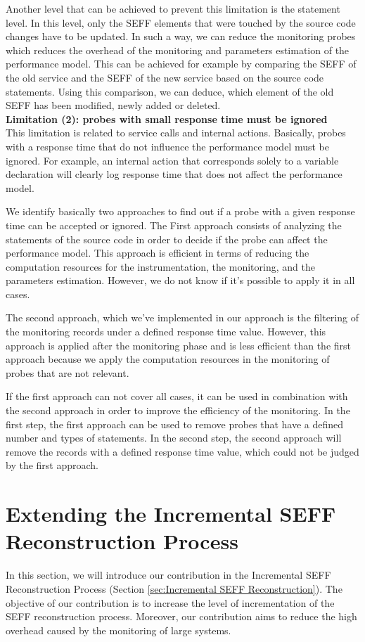 Another level that can be achieved to prevent this limitation is the statement level. In this level, only the SEFF elements that were touched by the source code changes have to be updated. In such a way, we can reduce the monitoring probes which reduces the overhead of the monitoring and parameters estimation of the performance model. This can be achieved for example by comparing the SEFF of the old service and the SEFF of the new service based on the source code statements. Using this comparison, we can deduce, which element of the old SEFF has been modified, newly added or deleted.  \\

\textbf{Limitation (2): probes with small response time must be ignored}\\
This limitation is related to service calls and internal actions. Basically, probes with a response time that do not influence the performance model must be ignored. For example, an internal action that corresponds solely to a variable declaration will clearly log response time that does not affect the performance model.
 
We identify basically two approaches to find out if a probe with a given response time can be accepted or ignored. The First approach consists of analyzing the statements of the source code in order to decide if the probe can affect the performance model. This approach is efficient in terms of reducing the computation resources for the instrumentation, the monitoring, and the parameters estimation.  However, we do not know if it's possible to apply it in all cases.

The second approach, which we've implemented in our approach is the filtering of the monitoring records under a defined response time value. However, this approach is applied after the monitoring phase and is less efficient than the first approach because we apply the computation resources in the monitoring of probes that are not relevant. 

If the first approach can not cover all cases, it can be used in combination with the second approach in order to improve the efficiency of the monitoring. In the first step, the first approach can be used to remove probes that have a defined number and types of statements. In the second step, the second approach will remove the records with a defined response time value, which could not be judged by the first approach.

\section{Extending the Incremental SEFF Reconstruction Process}
\label{sec:extend the incremental SEFF reconstruction process}
In this section, we will introduce our contribution in the Incremental SEFF Reconstruction Process (Section \ref{sec:Incremental SEFF Reconstruction}). The objective of our contribution is to increase the level of incrementation of the SEFF reconstruction process. Moreover, our contribution aims to reduce the high overhead caused by the monitoring of large systems.

